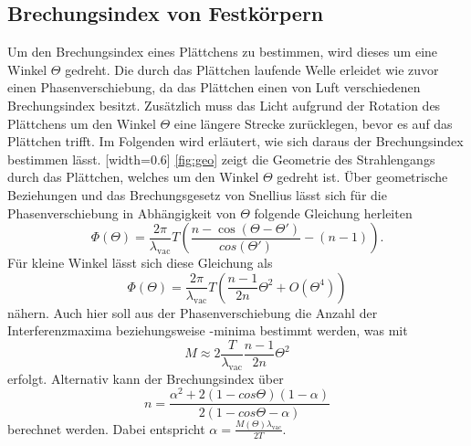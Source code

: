 \subsection{Brechungsindex von Festkörpern}
Um den Brechungsindex eines Plättchens zu bestimmen, wird dieses um eine Winkel $\Theta$ gedreht. Die durch das Plättchen laufende Welle erleidet wie zuvor einen Phasenverschiebung, da das Plättchen einen von Luft verschiedenen Brechungsindex besitzt. Zusätzlich muss das Licht aufgrund der Rotation des Plättchens um den Winkel $\Theta$ eine längere Strecke zurücklegen, bevor es auf das Plättchen trifft. Im Folgenden wird erläutert, wie sich daraus der Brechungsindex bestimmen lässt.
[width=0.6\textwidth]
\autoref{fig:geo} zeigt die Geometrie des Strahlengangs durch das Plättchen, welches um den Winkel $\Theta$ gedreht ist. Über geometrische Beziehungen und das Brechungsgesetz von Snellius lässt sich für die Phasenverschiebung in Abhängigkeit von $\Theta$ folgende Gleichung herleiten
\begin{equation}
  \Phi(\Theta) = \frac{2\pi}{\lambda_\mathrm{vac}}T \left( \frac{n-\cos(\Theta-\Theta')}{cos(\Theta')} - (n-1)\right).
\end{equation}
Für kleine Winkel lässt sich diese Gleichung als
\begin{equation}
  \Phi(\Theta) = \frac{2\pi}{\lambda_\mathrm{vac}}T\left(\frac{n-1}{2n}\Theta^2+O(\Theta^4)\right)
\end{equation}
nähern. Auch hier soll aus der Phasenverschiebung die Anzahl der Interferenzmaxima beziehungsweise -minima bestimmt werden, was mit
\begin{equation}
  \label{eqn:glas}
  M \approx 2 \frac{T}{\lambda_\mathrm{vac}}\frac{n-1}{2n}\Theta^2
\end{equation}
erfolgt. Alternativ kann der Brechungsindex über
\begin{equation}
  n = \frac{\alpha^2+2(1-cos\Theta)(1-\alpha)}{2(1-cos\Theta -\alpha)}
\end{equation}
berechnet werden. Dabei entspricht $\alpha = \frac{M(\Theta)\lambda_\mathrm{vac}}{2T}$.
